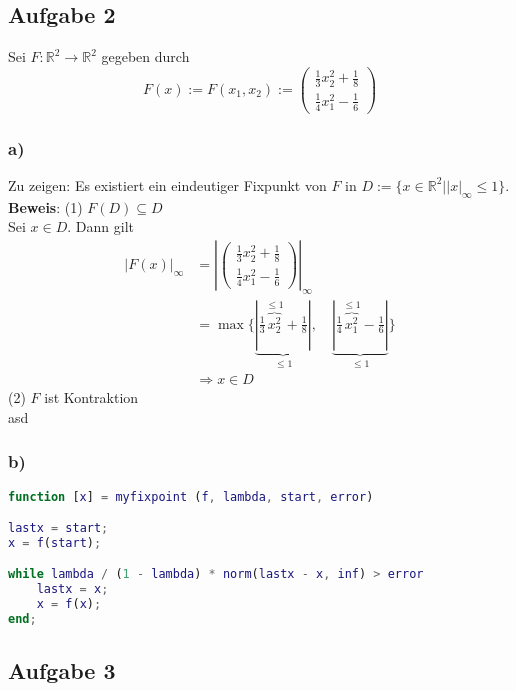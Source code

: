\documentclass[11pt,a4paper,ngerman]{article}
\begin{document}
\subsection*{Aufgabe 2}
Sei $F: \mathbb{R}^2 \to \mathbb{R}^2$ gegeben durch 
$$ F(x) := F(x_1,x_2) := \left(\begin{array}{c}
\frac{1}{3}x_2^2+\frac{1}{8}\\
\frac{1}{4}x_1^2-\frac{1}{6}\end{array} \right)$$

\subsubsection*{a)}
Zu zeigen: Es existiert ein eindeutiger Fixpunkt von $F$ in 
$D := \{x\in \mathbb{R}^2 | \left|x\right|_\infty \leq 1 \}$. \\

\textbf{Beweis}: (1) $F(D) \subseteq D$ \\
Sei $x \in D$. Dann gilt
\begin{equation*}\begin{split}
\left|F(x)\right|_\infty &=  \left|\left(\begin{array}{c}
\frac{1}{3}x_2^2+\frac{1}{8}\\
\frac{1}{4}x_1^2-\frac{1}{6}\end{array} \right)\right|_\infty \\
     &= \max \{ \underbrace{|\frac{1}{3}\overbrace{x_2^2}^{\leq 1}+\frac{1}{8}|}_{\leq 1}, \quad 
                \underbrace{|\frac{1}{4}\overbrace{x_1^2}^{\leq 1}-\frac{1}{6} |}_{\leq 1} \} \\
     &\Rightarrow x \in D
\end{split}\end{equation*}
(2) $F$ ist Kontraktion\\
asd
\subsubsection*{b)}
\begin{lstlisting}[language=matlab]
function [x] = myfixpoint (f, lambda, start, error)

lastx = start;
x = f(start);

while lambda / (1 - lambda) * norm(lastx - x, inf) > error
    lastx = x;
    x = f(x);
end;
\end{lstlisting}
\subsection*{Aufgabe 3}

\label{LastPage}
\end{document}
